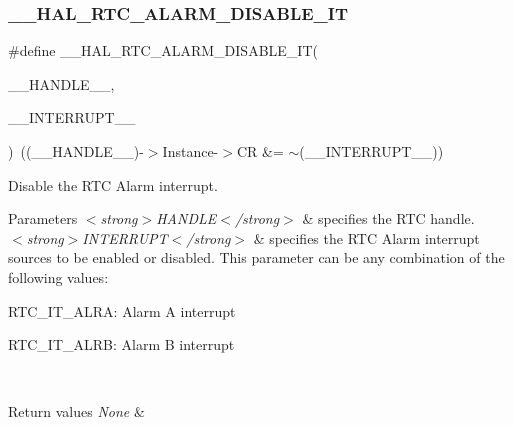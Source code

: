 \subsubsection{\texorpdfstring{\+\_\+\+\_\+\+H\+A\+L\+\_\+\+R\+T\+C\+\_\+\+A\+L\+A\+R\+M\+\_\+\+D\+I\+S\+A\+B\+L\+E\+\_\+\+IT}{\_\_HAL\_RTC\_ALARM\_DISABLE\_IT}}
{\footnotesize\ttfamily \#define \+\_\+\+\_\+\+H\+A\+L\+\_\+\+R\+T\+C\+\_\+\+A\+L\+A\+R\+M\+\_\+\+D\+I\+S\+A\+B\+L\+E\+\_\+\+IT(\begin{DoxyParamCaption}\item[{}]{\+\_\+\+\_\+\+H\+A\+N\+D\+L\+E\+\_\+\+\_\+,  }\item[{}]{\+\_\+\+\_\+\+I\+N\+T\+E\+R\+R\+U\+P\+T\+\_\+\+\_\+ }\end{DoxyParamCaption})~((\+\_\+\+\_\+\+H\+A\+N\+D\+L\+E\+\_\+\+\_\+)-\/$>$Instance-\/$>$CR \&= $\sim$(\+\_\+\+\_\+\+I\+N\+T\+E\+R\+R\+U\+P\+T\+\_\+\+\_\+))}



Disable the R\+TC Alarm interrupt. 


\begin{DoxyParams}{Parameters}
{\em $<$strong$>$\+H\+A\+N\+D\+L\+E$<$/strong$>$} & specifies the R\+TC handle. \\
\hline
{\em $<$strong$>$\+I\+N\+T\+E\+R\+R\+U\+P\+T$<$/strong$>$} & specifies the R\+TC Alarm interrupt sources to be enabled or disabled. This parameter can be any combination of the following values\+: \begin{DoxyItemize}
\item R\+T\+C\+\_\+\+I\+T\+\_\+\+A\+L\+RA\+: Alarm A interrupt \item R\+T\+C\+\_\+\+I\+T\+\_\+\+A\+L\+RB\+: Alarm B interrupt \end{DoxyItemize}
\\
\hline
\end{DoxyParams}

\begin{DoxyRetVals}{Return values}
{\em None} & \\
\hline
\end{DoxyRetVals}
\mbox{\label{group___r_t_c___exported___macros_gab40f07ff2cdf6fc98ccfdd856ba934e4}} 
